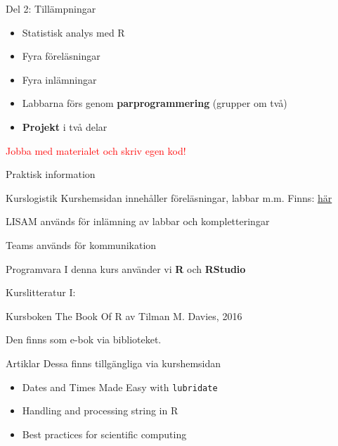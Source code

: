 \documentclass[
  10pt,
  ignorenonframetext,
]{beamer}
\providecommand{\tightlist}{%
  \setlength{\itemsep}{0pt}\setlength{\parskip}{0pt}}
\begin{document}

\begin{frame}{Del 2: Tillämpningar}
\protect\hypertarget{del-2-tilluxe4mpningar}{}
\begin{itemize}
\tightlist
\item
  Statistisk analys med R
\item
  Fyra föreläsningar
\item
  Fyra inlämningar
\item
  Labbarna förs genom \textbf{parprogrammering} (grupper om två)
\item
  \textbf{Projekt} i två delar
\end{itemize}

\pause

\textcolor{red}{Jobba med materialet och skriv egen kod!}
\end{frame}


\begin{frame}{Praktisk information}
\protect\hypertarget{praktisk-information}{}
\begin{block}{Kurslogistik}
\protect\hypertarget{kurslogistik}{}
Kurshemsidan innehåller föreläsningar, labbar m.m. Finns: \href{https://www.ida.liu.se/~732G33/info/courseinfo.sv.shtml}{här}

LISAM används för inlämning av labbar och kompletteringar

Teams används för kommunikation
\end{block}

\begin{block}{Programvara}
\protect\hypertarget{programvara}{}
I denna kurs använder vi \textbf{R} och \textbf{RStudio}
\end{block}
\end{frame}


\begin{frame}{Kurslitteratur I:}
\protect\hypertarget{kurslitteratur-i}{}
\begin{block}{Kursboken}
\protect\hypertarget{kursboken}{}
The Book Of R av Tilman M. Davies, 2016

Den finns som e-bok via biblioteket.
\end{block}

\begin{block}{Artiklar}
\protect\hypertarget{artiklar}{}
Dessa finns tillgängliga via kurshemsidan

\begin{itemize}
\tightlist
\item
  Dates and Times Made Easy with \texttt{lubridate}
\item
  Handling and processing string in R
\item
  Best practices for scientific computing
\end{itemize}
\end{block}
\end{frame}
\end{document}
